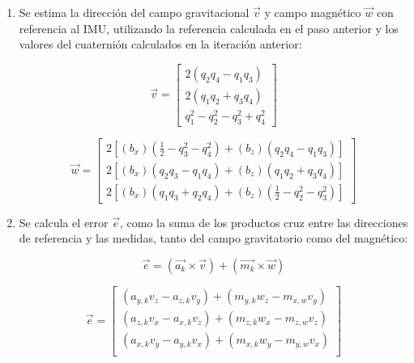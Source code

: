 \documentclass[conference]{IEEEtran}
\begin{document}
\begin{enumerate}
        \item Se estima la dirección del campo gravitacional \textbf{\textit{$\vec{v}$}} y campo magnético \textbf{\textit{$\vec{w}$}} con referencia al IMU, utilizando la referencia calculada en el paso anterior y los valores del cuaternión calculados en la iteración anterior:
        
        \begin{equation}        
            \vec{v} = 
                \begin{bmatrix}
                    2(q_2q_4 - q_1q_3) \\
                    2(q_1q_2 + q_3q_4) \\
                    q^2_1 - q^2_2 - q^2_3 +q^2_4  
                \end{bmatrix} 
        \end{equation}

        \begin{equation}        
            \vec{w} = 
                \begin{bmatrix}
                    2[(b_x)(\frac{1}{2} - q^2_3 - q^2_4) + (b_z)(q_2q_4 - q_1q_3)] \\
                    2[(b_x)(q_2q_3 - q_1q_4) + (b_z)(q_1q_2 + q_3q_4)] \\
                    2[(b_x)(q_1q_3 + q_2q_4) + (b_z)(\frac{1}{2} - q^2_2 - q^2_3)] 
                \end{bmatrix} 
        \end{equation}

        \item Se calcula el error $\vec{e}$, como la suma de los productos cruz entre las direcciones de referencia y las medidas, tanto del campo gravitatorio como del magnético:
        
        \begin{equation}
            \vec{e} = (\vec{a_k} \times \vec{v}) + (\vec{m_k} \times \vec{w}) 
        \end{equation}
            
        \begin{equation}
            \vec{e} = 
                \begin{bmatrix}
                    (a_{y,k}v_z - a_{z,k}v_y) + (m_{y,k}w_z - m_{x,w}v_y) \\
                    (a_{z,k}v_x - a_{x,k}v_z) + (m_{z,k}w_x - m_{z,w}v_z) \\
                    (a_{x,k}v_y - a_{y,k}v_x) + (m_{x,k}w_y - m_{y,w}v_x) \\
                \end{bmatrix} 
        \end{equation}
            

\end{enumerate}
\end{document}
